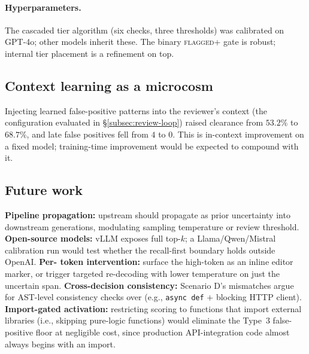 \paragraph{Hyperparameters.} The cascaded tier algorithm (six checks,
three thresholds) was calibrated on GPT-4o; other models inherit
these. The binary \textsc{flagged+} gate is robust; internal tier
placement is a refinement on top.

\subsection{Context learning as a microcosm}
\label{subsec:context}

Injecting learned false-positive patterns into the reviewer's context
(the configuration evaluated in \S\ref{subsec:review-loop}) raised
clearance from $53.2\%$ to $68.7\%$, and late false positives fell from
$4$ to $0$. This is in-context improvement on a fixed model;
training-time improvement would be expected to compound with it.

\subsection{Future work}
\label{subsec:future}

\textbf{Pipeline propagation:} upstream \eps should propagate as
prior uncertainty into downstream generations, modulating sampling
temperature or review threshold. \textbf{Open-source models:} vLLM
exposes full top-$k$; a Llama/Qwen/Mistral calibration run would test
whether the recall-first boundary holds outside OpenAI. \textbf{Per-%
token intervention:} surface the high-\eps token as an inline editor
marker, or trigger targeted re-decoding with lower temperature on
just the uncertain span. \textbf{Cross-decision consistency:}
Scenario D's mismatches argue for AST-level consistency checks over
\eps (e.g., \texttt{async def} $+$ blocking HTTP client).
\textbf{Import-gated activation:} restricting \eps scoring to
functions that import external libraries (i.e., skipping pure-logic
functions) would eliminate the Type~3 false-positive floor at
negligible cost, since production API-integration code almost always
begins with an import.
